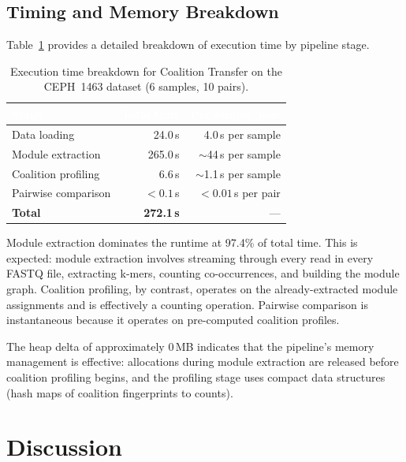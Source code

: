 \documentclass{../yalumba}
\begin{document}
\subsection{Timing and Memory Breakdown}
\label{sec:results-timing}

Table~\ref{tab:timing} provides a detailed breakdown of execution time by
pipeline stage.

\begin{table}[htbp]
\centering
\tablestyle
\caption{Execution time breakdown for Coalition Transfer on the CEPH~1463
dataset (6 samples, 10 pairs).}
\label{tab:timing}
\begin{tabular}{lrr}
\toprule
\rowcolor{table-header}
\textcolor{white}{\textbf{Stage}} &
\textcolor{white}{\textbf{Total time}} &
\textcolor{white}{\textbf{Per sample/pair}} \\
\midrule
Data loading          & 24.0\,s   & 4.0\,s per sample \\
Module extraction     & 265.0\,s  & $\sim$44\,s per sample \\
Coalition profiling   & 6.6\,s    & $\sim$1.1\,s per sample \\
Pairwise comparison   & $<0.1$\,s & $<0.01$\,s per pair \\
\midrule
\textbf{Total}        & \textbf{272.1\,s} & --- \\
\bottomrule
\end{tabular}
\end{table}

Module extraction dominates the runtime at 97.4\% of total time.  This is
expected: module extraction involves streaming through every read in every
FASTQ file, extracting k-mers, counting co-occurrences, and building the
module graph.  Coalition profiling, by contrast, operates on the already-extracted
module assignments and is effectively a counting operation.  Pairwise comparison
is instantaneous because it operates on pre-computed coalition profiles.

The heap delta of approximately 0\,MB indicates that the pipeline's memory
management is effective: allocations during module extraction are released
before coalition profiling begins, and the profiling stage uses compact
data structures (hash maps of coalition fingerprints to counts).


\section{Discussion}
\label{sec:discussion}
\end{document}
